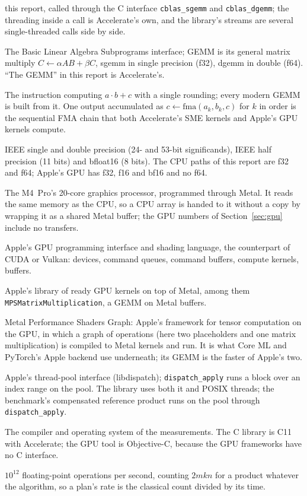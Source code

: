 \documentclass[11pt]{article}
\newcommand{\lv}[1]{\texttt{#1}}
\begin{document}
\begin{description}
  this report, called through the C interface \lv{cblas\_sgemm} and
  \lv{cblas\_dgemm}; the threading inside a call is Accelerate's own, and
  the library's streams are several single-threaded calls side by side.
\item[BLAS, GEMM, sgemm, dgemm.]  The Basic Linear Algebra Subprograms
  interface; GEMM is its general matrix multiply $C \leftarrow \alpha AB +
  \beta C$, sgemm in single precision (f32), dgemm in double (f64).  ``The
  GEMM'' in this report is Accelerate's.
\item[FMA, fused multiply-add.]  The instruction computing $a\cdot b + c$
  with a single rounding; every modern GEMM is built from it.  One output
  accumulated as $c \leftarrow \mathrm{fma}(a_k, b_k, c)$ for $k$ in order is
  the sequential FMA chain that both Accelerate's SME kernels and Apple's GPU
  kernels compute.
\item[f32, f64, f16, bf16.]  IEEE single and double precision (24- and
  53-bit significands), IEEE half precision (11 bits) and bfloat16 (8 bits).
  The CPU paths of this report are f32 and f64; Apple's GPU has f32, f16 and
  bf16 and no f64.
\item[GPU, unified memory.]  The M4~Pro's 20-core graphics processor,
  programmed through Metal.  It reads the same memory as the CPU, so a CPU
  array is handed to it without a copy by wrapping it as a shared Metal
  buffer; the GPU numbers of Section~\ref{sec:gpu} include no transfers.
\item[Metal.]  Apple's GPU programming interface and shading language, the
  counterpart of CUDA or Vulkan: devices, command queues, command buffers,
  compute kernels, buffers.
\item[MPS, Metal Performance Shaders.]  Apple's library of ready GPU kernels
  on top of Metal, among them \lv{MPSMatrixMultiplication}, a GEMM on Metal
  buffers.
\item[MPSGraph.]  Metal Performance Shaders Graph: Apple's framework for
  tensor computation on the GPU, in which a graph of operations (here two
  placeholders and one matrix multiplication) is compiled to Metal kernels
  and run.  It is what Core ML and PyTorch's Apple backend use underneath;
  its GEMM is the faster of Apple's two.
\item[Grand Central Dispatch.]  Apple's thread-pool interface (libdispatch);
  \lv{dispatch\_apply} runs a block over an index range on the pool.
  The library uses both it and POSIX threads; the benchmark's compensated reference product runs on the pool through \lv{dispatch\_apply}.
\item[Apple clang, macOS~26.]  The compiler and operating system of the
  measurements.  The C library is C11 with Accelerate; the GPU tool is
  Objective-C, because the GPU frameworks have no C interface.
\item[TFLOP/s.]  $10^{12}$ floating-point operations per second, counting
  $2mkn$ for a product whatever the algorithm, so a plan's rate is the
  classical count divided by its time.
\end{description}
\end{document}
